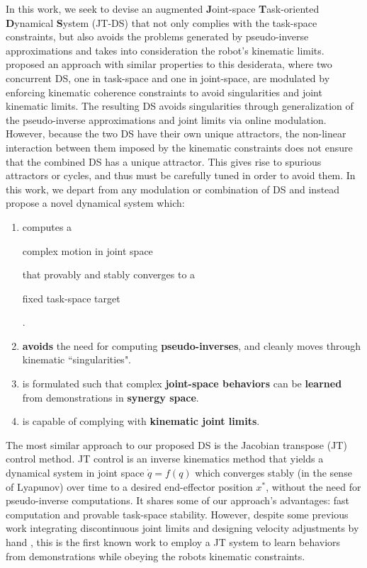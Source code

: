 \documentclass[letterpaper, 10 pt, conference,fleqn]{ieeeconf}
\begin{document}

In this work, we seek to devise an augmented \textbf{J}oint-space \textbf{T}ask-oriented \textbf{D}ynamical \textbf{S}ystem (JT-DS) that not only complies with the task-space constraints, but also avoids the problems generated by pseudo-inverse approximations and takes into consideration the robot's kinematic limits. \cite{hersch2008reaching} proposed an approach with similar properties to this desiderata, where two concurrent DS, one in task-space and one in joint-space, are modulated by enforcing kinematic coherence constraints to avoid singularities and joint kinematic limits. The resulting DS avoids singularities through generalization of the pseudo-inverse approximations and joint limits via online modulation. However, because the two DS have their own unique attractors, the non-linear interaction between them imposed by the kinematic constraints does not ensure that the combined DS has a unique attractor. This gives rise to spurious attractors or cycles, and thus must be carefully tuned in order to avoid them. In this work, we depart from any modulation or combination of DS and instead propose a novel dynamical system which:

\begin{enumerate}[leftmargin=*]
\item computes a \begin{bf}complex motion in joint space\end{bf} that provably and stably converges to a \begin{bf}fixed task-space target\end{bf}.
\item \textbf{avoids} the need for computing \textbf{pseudo-inverses}, and cleanly moves through kinematic ``singularities".
\item is formulated such that complex \textbf{joint-space behaviors} can be \textbf{learned} from demonstrations in \textbf{synergy space}.

\item is capable of complying with \textbf{kinematic joint limits}.
\end{enumerate}

The most similar approach to our proposed DS is the Jacobian transpose (JT) control \cite{wolovich1984computational} method. JT control is an inverse kinematics
method that yields a dynamical system in joint space $\dot{q} = f(q)$ which converges stably (in the sense of Lyapunov) over time to a desired end-effector position $x^*$, without the need for pseudo-inverse computations. It shares some of our approach's advantages: fast computation and provable task-space stability. However, despite some previous work integrating discontinuous joint limits \cite{sciavicco1988solution} and designing velocity adjustments by hand \cite{Shi2016}, this is the first known work to employ a JT system to learn behaviors from demonstrations while obeying the robots kinematic constraints.
\end{document}
